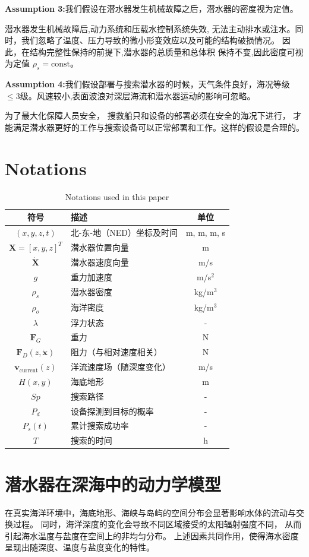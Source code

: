 \documentclass{mcmthesis}
\begin{document}
\textbf{Assumption 3:}我们假设在潜水器发生机械故障之后，潜水器的密度视为定值。

潜水器发生机械故障后,动力系统和压载水控制系统失效,
无法主动排水或注水。同时，我们忽略了温度、压力导致的微小形变效应以及可能的结构破损情况。
因此，在结构完整性保持的前提下,潜水器的总质量和总体积
保持不变,因此密度可视为定值 $\rho_s = \text{const}$。

\textbf{Assumption 4:}我们假设部署与搜索潜水器的时候，天气条件良好，海况等级$\leq3$级。风速较小,表面波浪对深层海流和潜水器运动的影响可忽略。

为了最大化保障人员安全，
搜救船只和设备的部署必须在安全的海况下进行，
才能满足潜水器更好的工作与搜索设备可以正常部署和工作。这样的假设是合理的。
\section{Notations}
\begin{table}[H]
\centering
\caption{Notations used in this paper}
\begin{tabularx}{0.8\textwidth}{cXc}
\toprule
符号 & 描述 & 单位 \\
\midrule
$(x,y,z,t)$ & 北-东-地（NED）坐标及时间 & m, m, m, s \\
$\bm{X}=[x,y,z]^T$ & 潜水器位置向量 & m \\
$\dot{\bm{X}}$ & 潜水器速度向量 & m/s \\
$g$ & 重力加速度 & m/s$^2$ \\
$\rho_s$ & 潜水器密度 & kg/m$^3$ \\
$\rho_o$ & 海洋密度 & kg/m$^3$ \\
$\lambda$ & 浮力状态& - \\
$\bm{F}_G$ & 重力 & N \\
$\bm{F}_D(z,\dot{\bm{x}})$ & 阻力（与相对速度相关） & N \\
$\bm{v}_{\mathrm{current}}(z)$ & 洋流速度场（随深度变化） & m/s \\
$H(x, y)$ & 海底地形 & m \\
$Sp$ & 搜索路径 & - \\
$P_d$ & 设备探测到目标的概率 & - \\
$P_s(t)$ & 累计搜索成功率 & - \\
$T$ & 搜索的时间 & h \\
\bottomrule
\end{tabularx}
\end{table}
\section{潜水器在深海中的动力学模型}
在真实海洋环境中，海底地形、海峡与岛屿的空间分布会显著影响水体的流动与交换过程。
同时，海洋深度的变化会导致不同区域接受的太阳辐射强度不同，
从而引起海水温度与盐度在空间上的非均匀分布。
上述因素共同作用，使得海水密度呈现出随深度、温度与盐度变化的特性。
\end{document}
